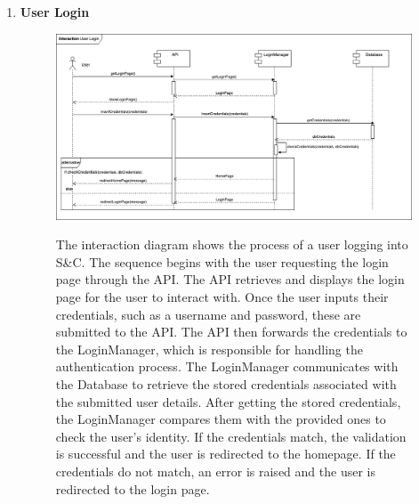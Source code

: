 \begin{enumerate}
    \item \textbf{User Login}
    \begin{figure}[h!]
            \centering  \includegraphics[width=1\textwidth]{DD/Images/Interactions/INT01_UserLogin.drawio.png}
            \label{fig:ComponentViewDiagram}
            \caption*{The interaction diagram shows the process of a user logging into S\&C. The sequence begins with the user requesting the login page through the API. The API retrieves and displays the login page for the user to interact with. Once the user inputs their credentials, such as a username and password, these are submitted to the API. The API then forwards the credentials to the LoginManager, which is responsible for handling the authentication process. The LoginManager communicates with the Database to retrieve the stored credentials associated with the submitted user details. After getting the stored credentials, the LoginManager compares them with the provided ones to check the user's identity. If the credentials match, the validation is successful and the user is redirected to the homepage. If the credentials do not match, an error is raised and the user is redirected to the login page.
            }
    \end{figure}



\end{enumerate}
